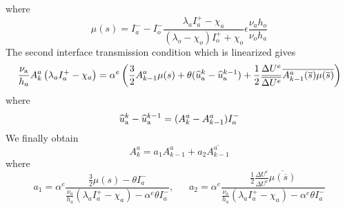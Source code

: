where
\begin{equation}
	\mu(s) = I_a^{-} - I_o^{-}
\frac{\lambda_a I_a^{+} - \chi_a}
	{(\lambda_o - \chi_o)I_o^{+} + \chi_o}
    \epsilon\frac{\nu_a h_o}
    {\nu_o h_a}
\end{equation}
The second interface transmission condition which
is linearized gives
\begin{equation}
\frac{\nu_{\rm a}}{h_a}A_k^a \left(\lambda_a I_a^{+} - \chi_a \right)
	=  \alpha^e \left(\frac{3}{2}A_{k-1}^a \mu(s)
+\theta ( \widehat{u}_{\rm a}^{k} -  \widehat{u}_{\rm a}^{k-1})
+ \frac{1}{2}\frac{\Delta U^e}{\overline{\Delta U^e}}
\overline{A_{k-1}^a(\overline{s}) \mu(\overline{s})}
\right)
\end{equation}
where
\begin{equation}
	\widehat{u}_{\rm a}^{k} -  \widehat{u}_{\rm a}^{k-1} = (A_k^a - A_{k-1}^a)I_a^{-}
\end{equation}
We finally obtain
\begin{equation}
    A_k^a = a_1 A_{k-1}^a + a_2 \overline{A_{k-1}^a}
\end{equation}
where
\begin{equation}
    a_1 = \alpha^e\frac{\frac{3}{2}\mu(s) - \theta I_a^{-}}
	{\frac{\nu_a}{h_a}\left(\lambda_a I_a^{+} - \chi_a \right)
	- \alpha^e \theta I_a^{-}}, ~~~~~~~
        a_2 = \alpha^e\frac{\frac{1}{2}\frac{\Delta U^e}{\overline{\Delta U^e}}
 \overline{\mu(\overline{s})}}
	{\frac{\nu_a}{h_a}\left(\lambda_a I_a^{+} - \chi_a \right)
	- \alpha^e \theta I_a^{-}}
\end{equation}
